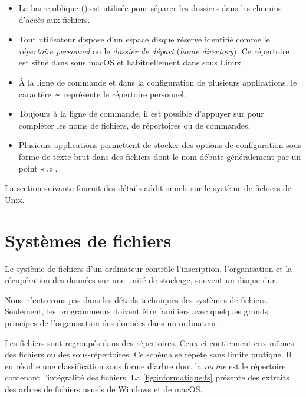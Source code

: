 \begin{itemize}
\item La barre oblique (\code{/}) est utilisée pour séparer les
  dossiers dans les chemins d'accès aux fichiers.
\item Tout utilisateur dispose d'un espace disque réservé identifié
  comme le \emph{répertoire personnel} ou
  le \emph{dossier
    de départ} (\emph{home directory}). Ce répertoire est situé dans
   sous macOS et habituellement dans  sous
  Linux.
\item À la ligne de commande et dans la configuration de plusieurs
  applications, le caractère \,\verb=~=\, représente le répertoire
  personnel.
\item Toujours à la ligne de commande, il est possible d'appuyer sur
   pour compléter les noms de fichiers, de répertoires ou de
  commandes.
\item Plusieurs applications permettent de stocker des options de
  configuration sous forme de texte brut dans des fichiers dont le nom
  débute généralement par un point «\verb=.=»\,.
\end{itemize}
La section suivante fournit des détails additionnels sur le système de
fichiers de Unix.


\section{Systèmes de fichiers}
\label{sec:informatique:fs}

Le système de fichiers d'un ordinateur
contrôle l'inscription, l'organisation et la récupération des données
sur une unité de stockage, souvent un disque dur.

Nous n'entrerons pas dans les détails techniques des systèmes de
fichiers. Seulement, les programmeurs doivent être familiers avec
quelques grands principes de l'organisation des données dans un
ordinateur.

Les fichiers sont regroupés dans des répertoires. Ceux-ci contiennent
eux-mêmes des fichiers ou des sous-répertoires. Ce schéma se répète
sans limite pratique. Il en résulte une classification sous forme
d'arbre dont la \emph{racine} est le répertoire contenant
l'intégralité des fichiers. La \autoref{fig:informatique:fs} présente
des extraits des arbres de fichiers usuels de Windows et de macOS.

